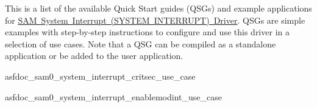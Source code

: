 This is a list of the available Quick Start guides (QSGs) and example applications for \mbox{\hyperlink{group__asfdoc__sam0__system__interrupt__group}{SAM System Interrupt (SYSTEM INTERRUPT) Driver}}. QSGs are simple examples with step-\/by-\/step instructions to configure and use this driver in a selection of use cases. Note that a QSG can be compiled as a standalone application or be added to the user application.


\begin{DoxyItemize}
\item asfdoc\+\_\+sam0\+\_\+system\+\_\+interrupt\+\_\+critsec\+\_\+use\+\_\+case
\item asfdoc\+\_\+sam0\+\_\+system\+\_\+interrupt\+\_\+enablemodint\+\_\+use\+\_\+case 
\end{DoxyItemize}